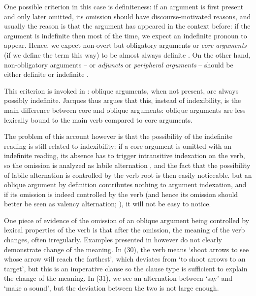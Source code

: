 \documentclass[a4paper, oneside, 12pt]{report}
\newcommand*{\citesec}[1]{\S~{#1}}
\newcommand*{\term}[1]{\emph{#1}}
\newcommand{\translate}[1]{`#1'}
\begin{document}
One possible criterion in this case is definiteness:
if an argument is first present and only later omitted, 
its omission should have discourse-motivated reasons,
and usually the reason is that the argument has appeared in the context before:
if the argument is indefinite then most of the time, we expect an indefinite pronoun to appear.
Hence, we expect non-overt but obligatory arguments or \term{core arguments}
(if we define the term this way)
to be almost always definite \citep[\citesec{22.1.2.1}]{jacques2021grammar}.
On the other hand, non-obligatory arguments 
-- or \term{adjuncts} or \term{peripheral arguments} --
should be either definite or indefinite
\citep[\citesec{22.1.2.2}]{jacques2021grammar}.

This criterion is invoked in \citet[\citesec{22.1.2.2}]{jacques2021grammar}:
oblique arguments, when not present, are always possibly indefinite.
Jacques thus argues that this, instead of indexibility, 
is the main difference between core and oblique arguments:
oblique arguments are less lexically bound to the main verb 
compared to core arguments.

The problem of this account however is that 
the possibility of the indefinite reading is still related to indexibility:
if a core argument is omitted with an indefinite reading,
its absence has to trigger intransitive indexation on the verb,
so the omission is analyzed as labile alternation
\citep[\citesec{22.1.2.1}]{jacques2021grammar},
and the fact that the possibility of labile alternation 
is controlled by the verb root is then easily noticeable. 
but an oblique argument by definition contributes nothing to argument indexation,
and if its omission is indeed controlled by the verb
(and hence its omission should better be seen as valency alternation;
),
it will not be easy to notice. 

One piece of evidence of the omission of an oblique argument being controlled by lexical properties of the verb
is that after the omission, the meaning of the verb changes, often irregularly.
Examples presented in \citet[\citesec{22.1.2.2}]{jacques2021grammar}
however do not clearly demonstrate change of the meaning.
In (30), the verb means \translate{shoot arrows to see whose arrow will reach the farthest},
which deviates from \translate{to shoot arrows to an target},
but this is an imperative clause so the clause type is sufficient to explain the change of the meaning.
In (31), we see an alternation between
\translate{say} and \translate{make a sound},
but the deviation between the two is not large enough. 
\end{document}
